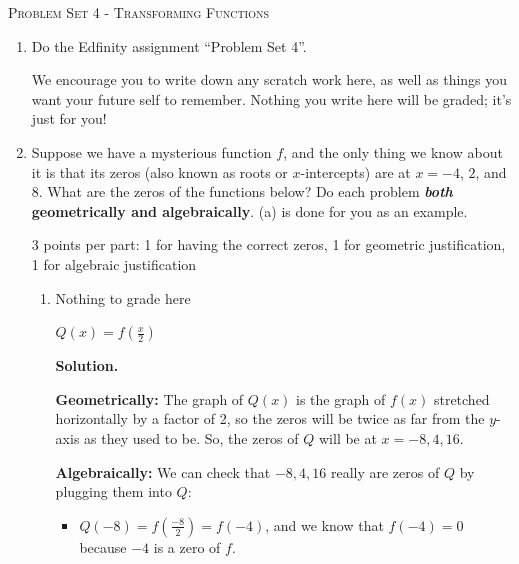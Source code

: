 \documentclass{article}
\newcommand{\doedfinity}[2][\newpage]{
  \begin{problem}[#1]
    Do the Edfinity assignment ``Problem Set #2''.

    We encourage you to write down any scratch work here, as well as
    things you want your future self to remember. Nothing you write
    here will be graded; it's just for you!
  \end{problem}
}
\begin{document}
\begin{center}
  \large\textsc{Problem Set 4 - Transforming Functions}
\end{center}

\begin{enumerate}
\item  {}

  \doedfinity{4}

\item  %

  Suppose we have a mysterious function $f$, and the only thing we know about it is that its zeros (also known as roots or $x$-intercepts) are at $x = -4$, $2$, and $8$. What are the zeros of the functions below? Do each problem \textbf{\emph{both} geometrically and algebraically}. (a) is done for you as an example.

  \begin{grading}
    3 points per part: 1 for having the correct zeros, 1 for geometric justification, 1 for algebraic justification 
  \end{grading}

  \begin{enumerate}
  \item

    \begin{grading}
      Nothing to grade here
    \end{grading}

    \begin{problem}
      $ Q(x) = f\left(\frac{x}{2}\right)$
    \end{problem}

    \textbf{Solution.}

    \textbf{Geometrically:} The graph of $Q(x)$ is the graph of $f(x)$ stretched horizontally by a factor of 2, so the zeros will be twice as far from the $y$-axis as they used to be. So, the zeros of $Q$ will be at $x = -8 , 4, 16$.

    \textbf{Algebraically:} We can check that $-8, 4, 16$ really are zeros of $Q$ by plugging them into $Q$:
    \begin{itemize}
    \item $Q(-8) = f \left(\frac{-8}{2} \right) = f(-4)$, and we know that $f(-4)= 0$ because $-4$ is a zero of $f$.


\end{itemize}
\end{enumerate}
\end{enumerate}
\end{document}
